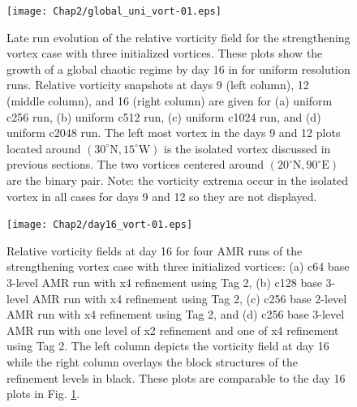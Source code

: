 \begin{figure}
   \centerline{%
   \noindent
   \texttt{[image: Chap2/global\_uni\_vort-01.eps]}}
   \caption{Late run evolution of the relative vorticity field for the 
   strengthening vortex case with three initialized vortices. These plots show
   the growth of a global chaotic regime by day 16 in for uniform resolution
   runs. Relative vorticity snapshots at days 9 (left column), 12 (middle column), 
   and 16 (right column) are given for
   (a) uniform c256 run, (b) uniform c512 run, (c) uniform c1024 run, and
   (d) uniform c2048 run. The left most vortex in the days 9 and 12 plots
   located around $(30^\circ \mathrm{N}, 15^\circ \mathrm{W})$ is the isolated
   vortex discussed in previous sections. The two vortices centered around
   $(20^\circ \mathrm{N}, 90^\circ \mathrm{E})$ are the binary pair. Note: the
   vorticity extrema occur in the isolated vortex in all cases for days 9 and 12 so they are 
   not displayed.}
   \label{fig:threevort_uni}
\end{figure}
\begin{figure}
   \centerline{%
   \noindent
   \texttt{[image: Chap2/day16\_vort-01.eps]}}
   \caption{Relative vorticity fields at day 16 for four AMR runs of the strengthening
   vortex case with three initialized vortices: 
   (a) c64 base 3-level AMR run with x4 refinement using Tag 2,
   (b) c128 base 3-level AMR run with x4 refinement using Tag 2,
   (c) c256 base 2-level AMR run with x4 refinement using Tag 2,
   and (d) c256 base 3-level AMR run with one level of x2 refinement 
   and one of x4 refinement using Tag 2. The left column depicts the vorticity 
   field at day 16 while the right column overlays
   the block structures of the refinement levels in black. These plots
   are comparable to the day 16 plots in Fig. \ref{fig:threevort_uni}.
   }
   \label{fig:vort_amr_day16}
\end{figure}


